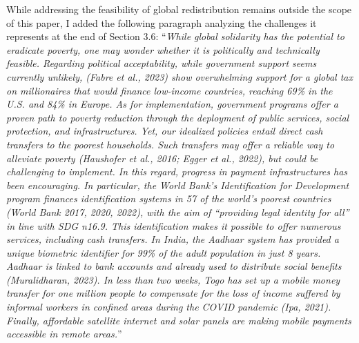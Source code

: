 \documentclass[12pt,english]{article}
\begin{document}
While addressing the feasibility of global redistribution remains outside the scope of this paper, I added the following paragraph analyzing the challenges it represents at the end of Section 3.6: 
``\textit{While global solidarity has the potential to eradicate poverty, one may wonder whether it is politically and technically feasible. 
Regarding political acceptability, while government support seems currently unlikely, (Fabre et al., 2023) show overwhelming support for a global tax on millionaires that would finance low-income countries, reaching 69\% in the U.S. and 84\% in Europe. %
As for implementation, government programs offer a proven path to poverty reduction through the deployment of public services, social protection, and infrastructures. 
Yet, our idealized policies entail direct cash transfers to the poorest households. Such transfers may offer a reliable way to alleviate poverty (Haushofer et al., 2016; Egger et al., 2022), but could be challenging to implement. In this regard, progress in payment infrastructures has been encouraging. In particular, the World Bank's \textit{Identification for Development} program finances identification systems in 57 of the world's poorest countries (World Bank 2017, 2020, 2022), with the aim of ``providing legal identity for all'' in line with SDG n\textdegree{}16.9. This identification makes it possible to offer numerous services, including cash transfers. In India, the Aadhaar system has provided a unique biometric identifier for 99\% of the adult population in just 8 years. Aadhaar is linked to bank accounts and already used to distribute social benefits (Muralidharan, 2023). In less than two weeks, Togo has set up a mobile money transfer for one million people to compensate for the loss of income suffered by informal workers in confined areas during the COVID pandemic (Ipa, 2021). Finally, affordable satellite internet and solar panels are making mobile payments accessible in remote areas.}''
~\\ ~\\

\clearpage 
\renewcommand{\url}[1]{\href{#1}{Link}} 
%  
% 
\end{document}
